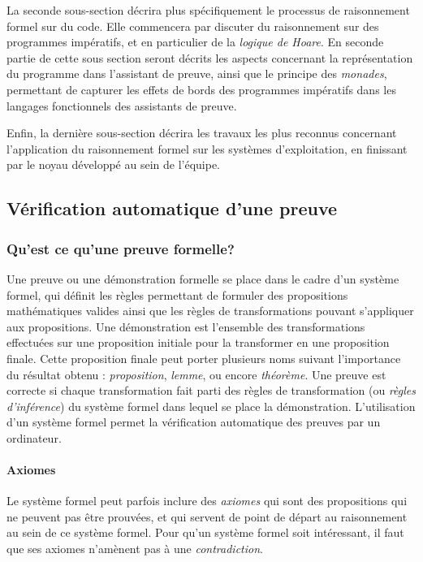 	La seconde sous-section décrira plus spécifiquement le processus de raisonnement formel sur du code. Elle commencera par discuter du raisonnement sur des programmes impératifs, et en particulier de la \emph{logique de Hoare}. En seconde partie de cette sous section seront décrits les aspects concernant la représentation du programme dans l'assistant de preuve, ainsi que le principe des \emph{monades}, permettant de capturer les effets de bords des programmes impératifs dans les langages fonctionnels des assistants de preuve.

	Enfin, la dernière sous-section décrira les travaux les plus reconnus concernant l'application du raisonnement formel sur les systèmes d'exploitation, en finissant par le noyau développé au sein de l'équipe.

		\subsection{Vérification automatique d'une preuve}

			\subsubsection{Qu'est ce qu'une preuve formelle?}
			Une preuve ou une démonstration formelle se place dans le cadre d'un système formel, qui définit les règles permettant de formuler des propositions mathématiques valides ainsi que les règles de transformations pouvant s'appliquer aux propositions. Une démonstration est l'ensemble des transformations effectuées sur une proposition initiale pour la transformer en une proposition finale. Cette proposition finale peut porter plusieurs noms suivant l'importance du résultat obtenu : \emph{proposition}, \emph{lemme}, ou encore \emph{théorème}. Une preuve est correcte si chaque transformation fait parti des règles de transformation (ou \emph{règles d'inférence}) du système formel dans lequel se place la démonstration. L'utilisation d'un système formel permet la vérification automatique des preuves par un ordinateur.

			\paragraph{Axiomes} Le système formel peut parfois inclure des \emph{axiomes} qui sont des propositions qui ne peuvent pas être prouvées, et qui servent de point de départ au raisonnement au sein de ce système formel. Pour qu'un système formel soit intéressant, il faut que ses axiomes n'amènent pas à une \emph{contradiction}.

